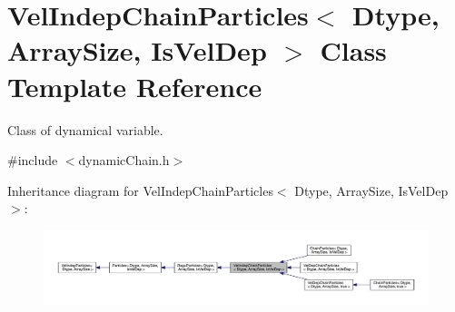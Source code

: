 \hypertarget{class_vel_indep_chain_particles}{}\section{Vel\+Indep\+Chain\+Particles$<$ Dtype, Array\+Size, Is\+Vel\+Dep $>$ Class Template Reference}
\label{class_vel_indep_chain_particles}


Class of dynamical variable.  




{\ttfamily \#include $<$dynamic\+Chain.\+h$>$}



Inheritance diagram for Vel\+Indep\+Chain\+Particles$<$ Dtype, Array\+Size, Is\+Vel\+Dep $>$\+:
\nopagebreak
\begin{figure}[H]
\begin{center}
\leavevmode
\includegraphics[width=350pt]{class_vel_indep_chain_particles__inherit__graph}
\end{center}
\end{figure}



